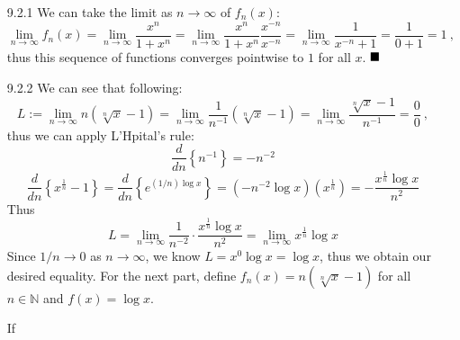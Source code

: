 \documentclass[11pt]{article}
\newcommand{\done}{\ensuremath{
    \strut\hfill\blacksquare
}}
\newcommand{\braces}[1]{\left\{#1\right\}}           %
\newcommand{\parens}[1]{\left(#1\right)}             %
\newcommand{\N}{\mathbb{N}}
\newcommand{\derv}[2]{\dfrac{d#1}{d#2}}
\newcommand{\lm}[1]{\displaystyle\lim_{#1}}
\begin{document}
\pagestyle{fancy}
\fancyhead{}

\normalsize

\begin{itemize}
    \item [9.2.1] We can take the limit as $n\to\infty$ of $f_n(x)$:
    \[\lm{n\to\infty}f_n(x)=\lm{n\to\infty}\frac{x^n}{1+x^n}=\lm{n\to\infty}\frac{x^n}{1+x^n}\frac{x^{-n}}{x^{-n}}=\lm{n\to\infty}\frac{1}{x^{-n}+1}=\frac{1}{0+1}=1\ ,\]
    thus this sequence of functions converges pointwise to $1$ for all $x$. \done

    \item [9.2.2] We can see that following:
    \[L:=\lm{n\to\infty}n\parens{\sqrt[n]{x}-1}=\lm{n\to\infty}\frac{1}{n^{-1}}\parens{\sqrt[n]{x}-1}=\lm{n\to\infty}\frac{\sqrt[n]{x}-1}{n^{-1}}=\frac{0}{0}\ ,\]
    thus we can apply L'Hpital's rule:
    \[\derv{}{n}\braces{n^{-1}}=-n^{-2}\]
    \[\derv{}{n}\braces{x^{\frac{1}{n}}-1}=\derv{}{n}\braces{e^{(1/n)\log x}}=(-n^{-2}\log x)(x^{\frac{1}{n}})=-\frac{x^{\frac{1}{n}}\log x}{n^2}\]
    Thus
    \[L=\lm{n\to\infty}\frac{1}{n^{-2}}\cdot\frac{x^{\frac{1}{n}}\log x}{n^2}=\lm{n\to\infty}x^{\frac{1}{n}}\log x\]
    Since $1/n\to0$ as $n\to\infty$, we know $L=x^0\log x=\log x$, thus we obtain our desired equality. For the next part, define $f_n(x)=n\parens{\sqrt[n]{x}-1}$ for all $n\in\N$ and $f(x)=\log x$.

    If 

\end{itemize}
\end{document}
